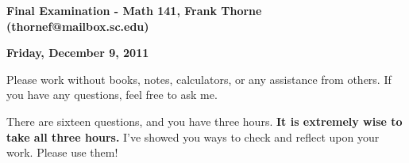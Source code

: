 \documentclass[12pt]{article}
\begin{document}
\setlength{\topmargin}{-2mm}





\begin{center}{\bf Final Examination - Math 141, Frank Thorne (thornef@mailbox.sc.edu)}
\end{center}
\begin{center}
{\bf Friday, December 9, 2011}
\end{center}

Please work without books, notes, calculators, or any assistance from others. If you have
any questions, feel free to ask me. 

There are sixteen questions, and you have three hours. {\bf It is extremely wise to take all
three hours.} I've showed you ways to check and reflect upon your work. Please use them!
\end{document}
